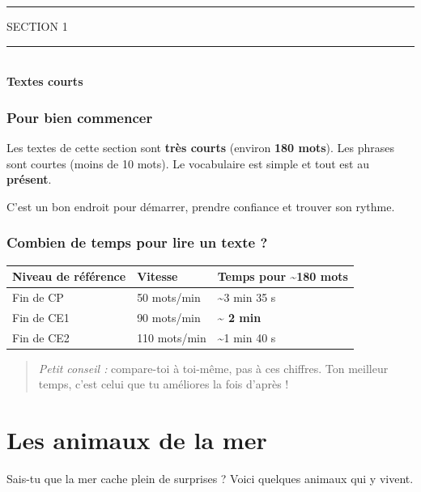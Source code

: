 \documentclass[
  french,
  14pt,
  a4paper,
]{extarticle}
\newcounter{none} %
\newcommand{\sectiondivider}[2]{%
  \vspace*{2cm}%
  \begin{center}
    {\fontsize{18pt}{22pt}\selectfont\textcolor{accentcolor}{\MakeUppercase{Section #1}}}\\[0.6em]
    \textcolor{accentcolor}{\rule{0.35\textwidth}{1.5pt}}\\[1em]
    {\fontsize{38pt}{44pt}\selectfont\bfseries #2}
  \end{center}
  \vspace{1.5cm}
}
\begin{document}
\begin{center}\rule{0.5\linewidth}{0.5pt}\end{center}

\newpage

\sectiondivider{1}{Textes courts}

\subsubsection{Pour bien commencer}\label{pour-bien-commencer}

Les textes de cette section sont \textbf{très courts} (environ
\textbf{180 mots}). Les phrases sont courtes (moins de 10 mots). Le
vocabulaire est simple et tout est au \textbf{présent}.

C'est un bon endroit pour démarrer, prendre confiance et trouver son
rythme.

\subsubsection{Combien de temps pour lire un texte
?}\label{combien-de-temps-pour-lire-un-texte}

{\def\LTcaptype{none} %
\begin{longtable}[]{@{}lll@{}}
\toprule\noalign{}
Niveau de référence & Vitesse & Temps pour \textasciitilde180 mots \\
\midrule\noalign{}
\endhead
\bottomrule\noalign{}
\endlastfoot
Fin de CP & 50 mots/min & \textasciitilde3 min 35 s \\
Fin de CE1 & 90 mots/min & \textbf{\textasciitilde{} 2 min} \\
Fin de CE2 & 110 mots/min & \textasciitilde1 min 40 s \\
\end{longtable}
}

\begin{quote}
\emph{Petit conseil :} compare-toi à toi-même, pas à ces chiffres. Ton
meilleur temps, c'est celui que tu améliores la fois d'après !
\end{quote}

\newpage

\section{Les animaux de la mer}\label{les-animaux-de-la-mer}

Sais-tu que la mer cache plein de surprises ? Voici quelques animaux qui
y vivent.
\end{document}
